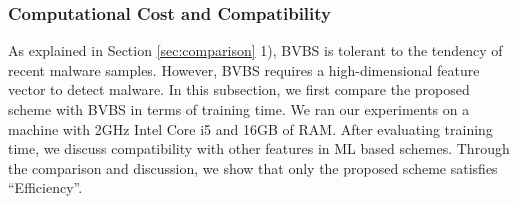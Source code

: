 \documentclass{ieeeaccess}
\begin{document}
\subsubsection{Computational Cost and Compatibility}
As explained in Section \ref{sec:comparison} 1), BVBS is tolerant to the tendency of recent malware samples.
However, BVBS requires a high-dimensional feature vector to detect malware.
In this subsection, we first compare the proposed scheme with BVBS in terms of training time.
We ran our experiments on a machine with 2GHz Intel Core i5 and 16GB of RAM.
After evaluating training time, we discuss compatibility with other features in ML based schemes.  
Through the comparison and discussion, we show that only the proposed scheme satisfies ``Efficiency''.
\end{document}
